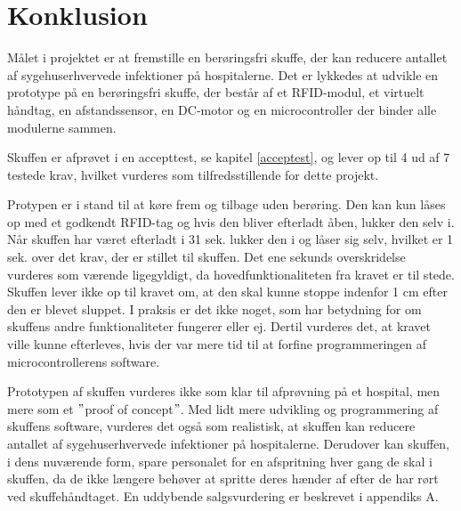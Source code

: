 \chapter{Konklusion}
\label{konklusion}
Målet i projektet er at fremstille en berøringsfri skuffe, der kan reducere antallet af sygehuserhvervede infektioner på hospitalerne. Det er lykkedes at udvikle en prototype på en berøringsfri skuffe, der består af et RFID-modul, et virtuelt håndtag, en afstandssensor, en DC-motor og en microcontroller der binder alle modulerne sammen.

Skuffen er afprøvet i en accepttest, se kapitel \ref{acceptest}, og lever op til 4 ud af 7 testede krav, hvilket vurderes som tilfredsstillende for dette projekt.

Protypen er i stand til at køre frem og tilbage uden berøring. Den kan kun låses op med et godkendt RFID-tag og hvis den bliver efterladt åben, lukker den selv i. Når skuffen har været efterladt i 31 sek. lukker den i og låser sig selv, hvilket er 1 sek. over det krav, der er stillet til skuffen. Det ene sekunds overskridelse vurderes som værende ligegyldigt, da hovedfunktionaliteten fra kravet er til stede. Skuffen lever ikke op til kravet om, at den skal kunne stoppe indenfor 1 cm efter den er blevet sluppet. I praksis er det ikke noget, som har betydning for om skuffens andre funktionaliteter fungerer eller ej. Dertil vurderes det, at kravet ville kunne efterleves, hvis der var mere tid til at forfine programmeringen af microcontrollerens software.

Prototypen af skuffen vurderes ikke som klar til afprøvning på et hospital, men mere som et $"$proof of concept$"$. Med lidt mere udvikling og programmering af skuffens software, vurderes det også som realistisk, at skuffen kan reducere antallet af sygehuserhvervede infektioner på hospitalerne. Derudover kan skuffen, i dens nuværende form, spare personalet for en afspritning hver gang de skal i skuffen, da de ikke længere behøver at spritte deres hænder af efter de har rørt ved skuffehåndtaget. En uddybende salgsvurdering er beskrevet i appendiks A.